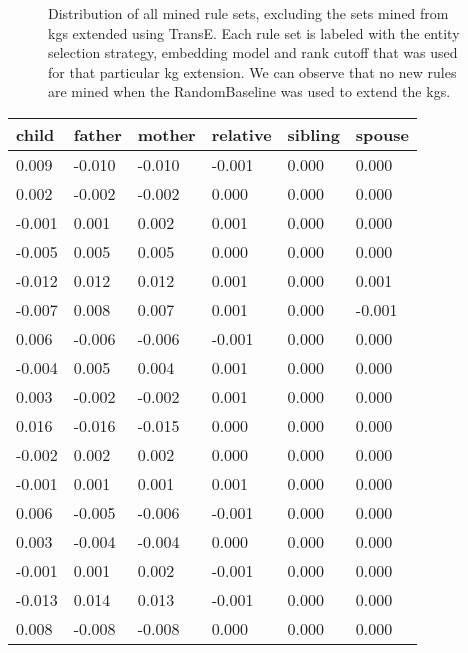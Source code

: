 \begin{figure}[htbp]
\centering
    \centering
    
    \caption[Dist. of all sets of mined rules, excluding TransE.]{Distribution of all mined rule sets, excluding the sets mined from \glspl{kg} extended using TransE. Each rule set is labeled with the entity selection strategy, embedding model and rank cutoff that was used for that particular \gls{kg} extension. We can observe that no new rules are mined when the RandomBaseline was used to extend the \glspl{kg}.}
    \label{all_sets_w_out_TransE}
\end{figure}


\begin{longtable}{llllll}
\textbf{child} & \textbf{father} & \textbf{mother} & \textbf{relative} & \textbf{sibling} & \textbf{spouse} \\ \hline
0.009  & -0.010 & -0.010 & -0.001   & 0.000   & 0.000  \\
0.002  & -0.002 & -0.002 & 0.000    & 0.000   & 0.000  \\
-0.001 & 0.001  & 0.002  & 0.001    & 0.000   & 0.000  \\
-0.005 & 0.005  & 0.005  & 0.000    & 0.000   & 0.000  \\
-0.012 & 0.012  & 0.012  & 0.001    & 0.000   & 0.001  \\
-0.007 & 0.008  & 0.007  & 0.001    & 0.000   & -0.001 \\
0.006  & -0.006 & -0.006 & -0.001   & 0.000   & 0.000  \\
-0.004 & 0.005  & 0.004  & 0.001    & 0.000   & 0.000  \\
0.003  & -0.002 & -0.002 & 0.001    & 0.000   & 0.000  \\
0.016  & -0.016 & -0.015 & 0.000    & 0.000   & 0.000  \\
-0.002 & 0.002  & 0.002  & 0.000    & 0.000   & 0.000  \\
-0.001 & 0.001  & 0.001  & 0.001    & 0.000   & 0.000  \\
0.006  & -0.005 & -0.006 & -0.001   & 0.000   & 0.000  \\
0.003  & -0.004 & -0.004 & 0.000    & 0.000   & 0.000  \\
-0.001 & 0.001  & 0.002  & -0.001   & 0.000   & 0.000  \\
-0.013 & 0.014  & 0.013  & -0.001   & 0.000   & 0.000  \\
0.008  & -0.008 & -0.008 & 0.000    & 0.000   & 0.000  \\

\end{longtable}
